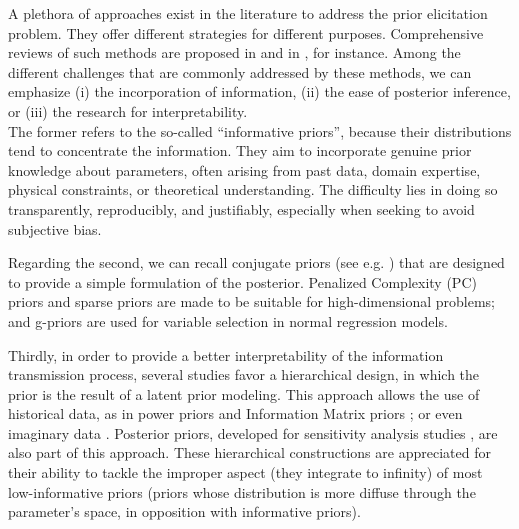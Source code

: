 A plethora of approaches exist in the literature to address the prior elicitation problem. They offer different strategies for different purposes. 
Comprehensive reviews of such methods are proposed in \cite{mikkola_prior_2023}
and in \cite{consonni_prior_2018}, for instance.
Among the different challenges that are commonly addressed by these methods, we can emphasize (i) the incorporation of information, (ii) the ease of posterior inference, or (iii) the research for interpretability.\\
The former refers to the so-called ``informative priors'', because their distributions tend to concentrate the information. %
They aim to incorporate genuine prior knowledge about parameters, often arising from past data, domain expertise, physical constraints, or theoretical understanding. %
The difficulty lies in doing so transparently, reproducibly, and justifiably, especially when seeking to avoid subjective bias.

Regarding the second, we can recall conjugate priors (see e.g. \cite{robert_bayesian_2007}) that are designed to provide a simple formulation of the posterior. Penalized Complexity (PC) priors \citep{simpson_penalising_2017} and sparse priors \citep{castillo_bayesian_2015} are made to be suitable for high-dimensional problems; and g-priors \citep{liang_mixtures_2008,galharret_bayesian_2023} are used for variable selection in normal regression models.

Thirdly, in order to provide a better interpretability of the information transmission process, several studies favor a hierarchical design, in which the prior is the result of a latent prior modeling. This approach allows the use of historical data, as in power priors \citep{chen_relationship_2006} and Information Matrix priors \citep{gupta_information_2009}; or even imaginary data \citep{perez_expectedposterior_2002,spitzner_neutral-data_2011}. Posterior priors, developed for sensitivity analysis studies \citep{bousquet_discussion_2024}, are also part of this approach. %
These hierarchical constructions are appreciated for their ability to tackle the improper aspect (they integrate to infinity) of most low-informative priors
(priors whose distribution is more diffuse through the parameter's space, in opposition with informative priors).\\



